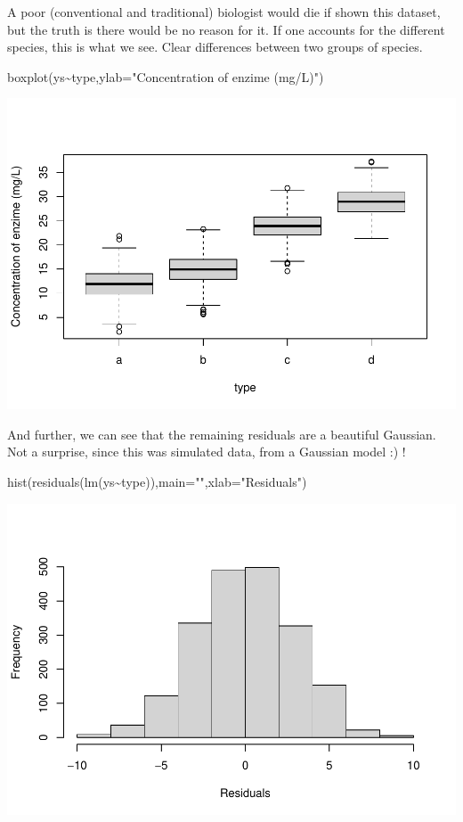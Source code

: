 \documentclass[
]{book}
\newenvironment{Shaded}{\begin{snugshade}}{\end{snugshade}}
\newcommand{\AttributeTok}[1]{\textcolor[rgb]{0.77,0.63,0.00}{#1}}
\newcommand{\FunctionTok}[1]{\textcolor[rgb]{0.00,0.00,0.00}{#1}}
\newcommand{\NormalTok}[1]{#1}
\newcommand{\SpecialCharTok}[1]{\textcolor[rgb]{0.00,0.00,0.00}{#1}}
\newcommand{\StringTok}[1]{\textcolor[rgb]{0.31,0.60,0.02}{#1}}
\begin{document}
A poor (conventional and traditional) biologist would die if shown this dataset, but the truth is there would be no reason for it. If one accounts for the different species, this is what we see. Clear differences between two groups of species.

\begin{Shaded}
\begin{Highlighting}[]
\FunctionTok{boxplot}\NormalTok{(ys}\SpecialCharTok{\textasciitilde{}}\NormalTok{type,}\AttributeTok{ylab=}\StringTok{"Concentration of enzime (mg/L)"}\NormalTok{)}
\end{Highlighting}
\end{Shaded}

\includegraphics{ECOMODbook_files/figure-latex/reg11-1.pdf}

And further, we can see that the remaining residuals are a beautiful Gaussian. Not a surprise, since this was simulated data, from a Gaussian model :) !

\begin{Shaded}
\begin{Highlighting}[]
\FunctionTok{hist}\NormalTok{(}\FunctionTok{residuals}\NormalTok{(}\FunctionTok{lm}\NormalTok{(ys}\SpecialCharTok{\textasciitilde{}}\NormalTok{type)),}\AttributeTok{main=}\StringTok{""}\NormalTok{,}\AttributeTok{xlab=}\StringTok{"Residuals"}\NormalTok{)}
\end{Highlighting}
\end{Shaded}

\includegraphics{ECOMODbook_files/figure-latex/reg12-1.pdf}
\end{document}
